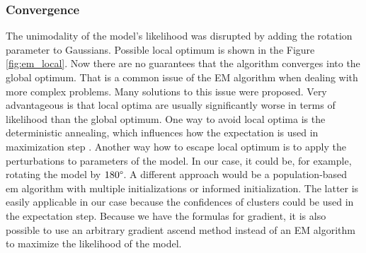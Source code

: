 \subsubsection{Convergence}
The unimodality of the model's likelihood was disrupted by adding the rotation parameter to Gaussians. Possible local optimum is shown in the Figure \ref{fig:em_local}. Now there are no guarantees that the algorithm converges into the global optimum. That is a common issue of the EM algorithm when dealing with more complex problems. Many solutions to this issue were proposed. Very advantageous is that local optima are usually significantly worse in terms of likelihood than the global optimum. One way to avoid local optima is the deterministic annealing, which influences how the expectation is used in maximization step \cite{ueda1998}. Another way how to escape local optimum is to apply the perturbations to parameters of the model. In our case, it could be, for example, rotating the model by $180\degree$. A different approach would be a population-based em algorithm with multiple initializations or informed initialization. The latter is easily applicable in our case because the confidences of clusters could be used in the expectation step. Because we have the formulas for gradient, it is also possible to use an arbitrary gradient ascend method instead of an EM algorithm to maximize the likelihood of the model.

